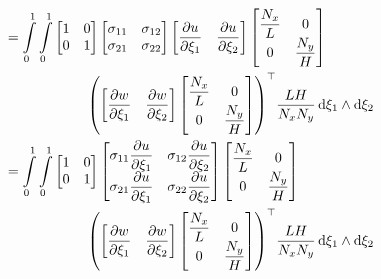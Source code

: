 \begin{equation}
\begin{aligned}
    &=\dintl{0}{1}\dintl{0}{1}\begin{bmatrix}
        1 & 0 \\
        0 & 1
    \end{bmatrix}\begin{bmatrix}
      \sigma_{11} & \sigma_{12} \\
      \sigma_{21} & \sigma_{22}
    \end{bmatrix}
    \begin{bmatrix}\delby{u}{\xi_{1}}&\delby{u}{\xi_{2}}\end{bmatrix}\begin{bmatrix}
      \dfrac{N_{x}}{L} & 0 \\
      0 & \dfrac{N_{y}}{H}
    \end{bmatrix} \\
    &\qquad\qquad\qquad\transpose{\pbrac{\begin{bmatrix}\delby{w}{\xi_{1}}&\delby{w}{\xi_{2}}\end{bmatrix}\begin{bmatrix}
      \dfrac{N_{x}}{L} & 0 \\
      0 & \dfrac{N_{y}}{H}
    \end{bmatrix}}}\dfrac{LH}{N_{x}N_{y}}\,\exteriorderivop\xi_{1}\wedge\exteriorderivop\xi_{2} \\
    &=\dintl{0}{1}\dintl{0}{1}\begin{bmatrix}
        1 & 0 \\
        0 & 1
    \end{bmatrix}\begin{bmatrix}
      \sigma_{11}\delby{u}{\xi_{1}} & \sigma_{12}\delby{u}{\xi_{2}} \\
      \sigma_{21}\delby{u}{\xi_{1}} & \sigma_{22}\delby{u}{\xi_{2}}\end{bmatrix}
    \begin{bmatrix}
      \dfrac{N_{x}}{L} & 0 \\
      0 & \dfrac{N_{y}}{H}
    \end{bmatrix} \\
    &\qquad\qquad\qquad\transpose{\pbrac{\begin{bmatrix}\delby{w}{\xi_{1}}&\delby{w}{\xi_{2}}\end{bmatrix}\begin{bmatrix}
      \dfrac{N_{x}}{L} & 0 \\
      0 & \dfrac{N_{y}}{H}
    \end{bmatrix}}}\dfrac{LH}{N_{x}N_{y}}\,\exteriorderivop\xi_{1}\wedge\exteriorderivop\xi_{2} \\

\end{aligned}
\end{equation}
